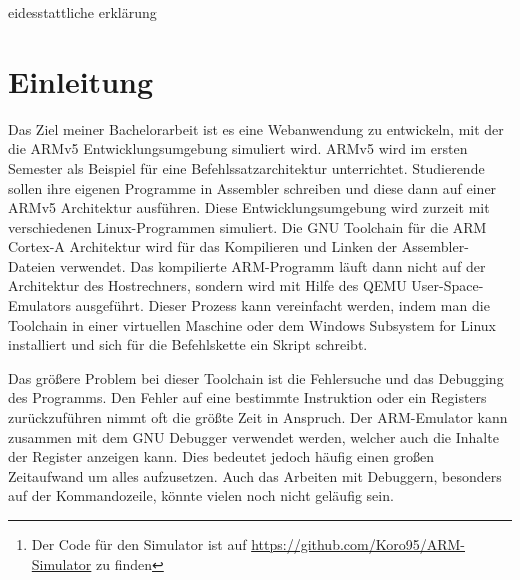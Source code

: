 \documentclass[a4paper, 11pt, onecolumn]{article}
\begin{document}
eidesstattliche erklärung

\newpage    
    
\begin{abstract}

Kurzfassung \footnote{Der Code für den Simulator ist auf \url{https://github.com/Koro95/ARM-Simulator} zu finden}



\end{abstract}

\newpage

\tableofcontents

\newpage

\setcounter{page}{1}

\section{Einleitung}

Das Ziel meiner Bachelorarbeit ist es eine Webanwendung zu entwickeln, mit der die ARMv5 Entwicklungsumgebung simuliert wird. ARMv5 \cite{arm:2005} wird im ersten Semester als Beispiel für eine Befehlssatzarchitektur unterrichtet. Studierende sollen ihre eigenen Programme in Assembler \cite{assembly} schreiben und diese dann auf einer ARMv5 Architektur ausführen. Diese Entwicklungsumgebung wird zurzeit mit verschiedenen Linux-Programmen simuliert. Die GNU Toolchain für die ARM Cortex-A Architektur \cite{gnutoolchain} wird für das Kompilieren und Linken der Assembler-Dateien verwendet. Das kompilierte ARM-Programm läuft dann nicht auf der Architektur des Hostrechners, sondern wird mit Hilfe des QEMU User-Space-Emulators \cite{qemu} ausgeführt. Dieser Prozess kann vereinfacht werden, indem man die Toolchain in einer virtuellen Maschine oder dem Windows Subsystem for Linux \cite{wsl} installiert und sich für die Befehlskette ein Skript schreibt.

Das größere Problem bei dieser Toolchain ist die Fehlersuche und das Debugging des Programms. Den Fehler auf eine bestimmte Instruktion oder ein Registers zurückzuführen nimmt oft die größte Zeit in Anspruch. Der ARM-Emulator kann zusammen mit dem GNU Debugger \cite{gdb}  verwendet werden, welcher auch die Inhalte der Register anzeigen kann. Dies bedeutet jedoch häufig einen großen Zeitaufwand um alles aufzusetzen. Auch das Arbeiten mit Debuggern, besonders auf der Kommandozeile, könnte vielen noch nicht geläufig sein. 
\end{document}
